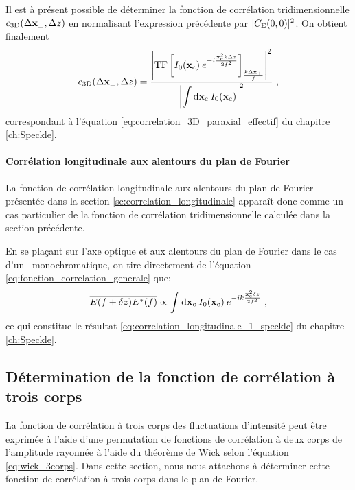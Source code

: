 Il est à présent possible de déterminer la fonction de corrélation tridimensionnelle $c_{\mathrm{3D}}(\Delta\mathbf{x}_{\perp}, \Delta z)$ en normalisant l'expression précédente par $|C_{\mathrm{E}}(0,0)|^2$. On obtient finalement
\begin{equation}
c_{\mathrm{3D}}(\Delta \mathbf{x}_{\perp} , \Delta z) = \frac{{\left| \mathrm{TF} \left[ I_0(\mathbf{x}_{\mathrm{c}})\: e^{-i\frac{\mathbf{x}_{\mathrm{c}}^2 k \Delta z}{2f^2}} \right]_{\frac{k\Delta\mathbf{x}_{\perp}}{f}}\right|}^2}{{\left|\displaystyle\int{\mathop{}\mathopen{}\mathrm{d}\mathbf{x}_{\mathrm{c}}\: I_0(\mathbf{x}_{\mathrm{c}})}\right|}^2} \text{ ,}
\end{equation}
correspondant à l'équation \ref{eq:correlation_3D_paraxial_effectif} du chapitre \ref{ch:Speckle}.

\paragraph*{Corrélation longitudinale aux alentours du plan de Fourier}
La fonction de corrélation longitudinale aux alentours du plan de Fourier présentée dans la section \ref{sc:correlation_longitudinale} apparaît donc comme un cas particulier de la fonction de corrélation tridimensionnelle calculée dans la section précédente. 

En se plaçant sur l'axe optique et aux alentours du plan de Fourier dans le cas d'un \speckle\ monochromatique, on tire directement de l'équation \ref{eq:fonction_correlation_generale} que:
\begin{equation}
\overline{E(f+\delta z)E^*(f)} \propto \int{\mathop{}\mathopen{}\mathrm{d}\mathbf{x}_{\mathrm{c}}\: I_0(\mathbf{x}_{\mathrm{c}}) \: e^{-ik \frac{\mathbf{x}_{\mathrm{c}}^2 \delta z}{2f^2}}} \text{ ,}
\end{equation}
ce qui constitue le résultat \ref{eq:correlation_longitudinale_1_speckle} du chapitre \ref{ch:Speckle}.

\subsection{Détermination de la fonction de corrélation à trois corps}
La fonction de corrélation à trois corps des fluctuations d'intensité peut être exprimée à l'aide d'une permutation de fonctions de corrélation à deux corps de l'amplitude rayonnée à l'aide du théorème de Wick selon l'équation \ref{eq:wick_3corps}. Dans cette section, nous nous attachons à déterminer cette fonction de corrélation à trois corps dans le plan de Fourier.

